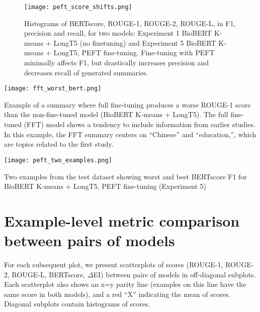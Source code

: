 \documentclass[11pt]{article}
\begin{document}
\FloatBarrier

\begin{figure}
    \centering
    \texttt{[image: peft\_score\_shifts.png]}
    \caption{Histograms of BERTscore, ROUGE-1, ROUGE-2, ROUGE-L, in F1, precision and recall, for two models: Experiment 1 BioBERT K-means + LongT5 (no finetuning) and Experiment 5 BioBERT K-means + LongT5, PEFT fine-tuning. Fine-tuning with PEFT minimally affects F1, but drastically increases precision and decreases recall of generated summaries.}
    \label{fig:peft_score_shifts}
\end{figure}

\begin{table}
    \centering
    \texttt{[image: fft\_worst\_bert.png]}
    \caption{Example of a summary where full fine-tuning produces a worse ROUGE-1 score than the non-fine-tuned model (BioBERT K-means + LongT5). The full fine-tuned (FFT) model shows a tendency to include information from earlier studies. In this example, the FFT summary centers on “Chinese” and “education,”, which are topics related to the first study.}
    \label{tab:fft_worst_bert}
\end{table}

\begin{table}
    \centering
    \texttt{[image: peft\_two\_examples.png]}
    \caption{Two examples from the test dataset showing worst and best BERTscore F1 for BioBERT K-means + LongT5, PEFT fine-tuning (Experiment 5)}
    \label{tab:best-worst-peft}
\end{table}


\FloatBarrier

\section{Example-level metric comparison between pairs of models}
\label{app:pairwise-model-comparison}

For each subsequent plot, we present scatterplots of scores (ROUGE-1, ROUGE-2, ROUGE-L, BERTscore, $\Delta$EI) between pairs of models in off-diagonal subplots. Each scatterplot also shows an x=y parity line (examples on this line have the same score in both models), and a red “X” indicating the mean of scores. Diagonal subplots contain histograms of scores.
\end{document}
